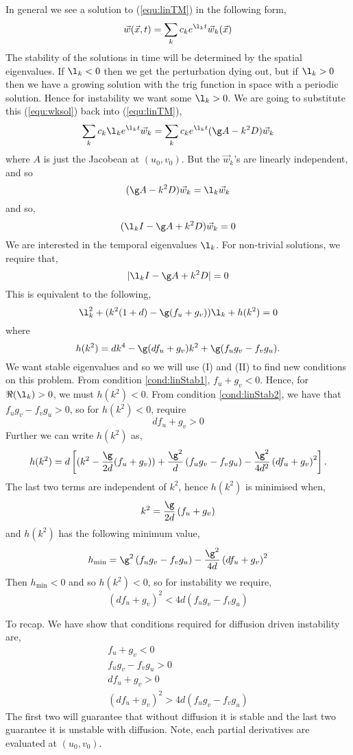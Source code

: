 \noindent
In general we see a solution to (\ref{equ:linTM}) in the following form,
\begin{equation}
  \vec w(\vec x, t) = \sum_k c_k e^{\l_k t}\vec w_k(\vec x)\label{equ:wksol}
\end{equation}
The stability of the solutions in time will be determined by the spatial eigenvalues. If $\l_k < 0$ then we get the perturbation dying out, but if $\l_k > 0$ then we have a growing solution with the trig function in space with a periodic solution. Hence for instability we want some $\l_k > 0$. We are going to substitute this (\ref{equ:wksol}) back into (\ref{equ:linTM}),
$$ \sum_k c_k\l_k e^{\l_k t} \vec w_k = \sum_k c_ke^{\l_k t} (\g A - k^2 D)\vec w_k $$
where $A$ is just the Jacobean at $(u_0, v_0)$. But the $\vec w_k$'s are linearly independent, and so
$$ (\g A - k^2D)\vec w_k = \l_k \vec w_k $$
and so,
$$ (\l_kI - \g A + k^2D)\vec w_k = 0 $$
We are interested in the temporal eigenvalues $\l_k$. For non-trivial solutions, we require that,
$$ |\l_k I - \g A + k^2D| = 0 $$
This is equivalent to the following,
$$ \l_k^2 + (k^2(1 + d) - \g(f_u + g_v))\l_k + h(k^2) = 0 $$
where
$$h(k^2) = dk^4 - \g(df_u + g_v)k^2 + \g(f_ug_v - f_vg_u).$$
We want stable eigenvalues and so we will use (I) and (II) to find new conditions on this problem. From condition \ref{cond:linStab1}, $f_u + g_v < 0$. Hence, for $\Re (\l_k) > 0$, we must $h(k^2) < 0$. From condition \ref{cond:linStab2}, we have that $f_ug_v - f_vg_u > 0$, so for $h(k^2) < 0$, require
\begin{equation}
  df_u + g_v > 0 \tag{III}\label{cond:linStab3}
\end{equation}
Further we can write $h(k^2)$ as,
$$ h(k^2) = d\left[ (k^2 - \frac{\g}{2d}(f_u + g_v)) + \frac{\g^2}{d}\left( f_ug_v - f_vg_u \right) - \frac{\g^2}{4d^2} \left( df_u + g_v \right)^2 \right]. $$
The last two terms are independent of $k^2$, hence $h(k^2)$ is minimised when,
\begin{equation}
  k^2 = \frac{\g}{2d}\left( f_u + g_v \right)\label{equ:hkmin}
\end{equation}
and $h(k^2)$ has the following minimum value,
$$ h_{\text{min}} = \g^2 \left( f_ug_v - f_vg_u \right) - \frac{\g^2}{4d} \left( df_u + g_v \right)^2 $$
Then $h_{\text{min}} < 0$ and so $h(k^2) < 0$, so for instability we require,
\begin{equation}
  (df_u + g_v)^2 < 4d(f_ug_v - f_vg_u)\label{linStab4}\tag{IV}
\end{equation}

\noindent
To recap. We have show that conditions required for diffusion driven instability are,
\begin{align}
  f_u + g_v < 0 \tag{I} \\
  f_ug_v - f_vg_u > 0 \tag{II} \\
  df_u + g_v > 0 \tag{III} \\
  (df_u + g_v)^2 > 4d(f_ug_v - f_vg_u) \tag{IV}
\end{align}
The first two will guarantee that without diffusion it is stable and the last two guarantee it is unstable with diffusion. Note, each partial derivatives are evaluated at $(u_0, v_0)$. \\

